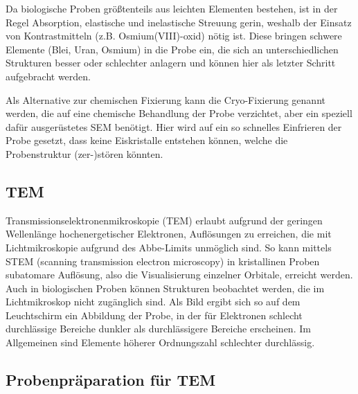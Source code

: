 Da biologische Proben größtenteils aus leichten Elementen bestehen, ist in der Regel Absorption, elastische und inelastische Streuung gerin, weshalb der Einsatz von Kontrastmitteln (z.B. Osmium(VIII)-oxid) nötig ist.
Diese bringen schwere Elemente (Blei, Uran, Osmium) in die Probe ein, die sich an unterschiedlichen Strukturen besser oder schlechter anlagern und können hier als letzter Schritt aufgebracht werden.

Als Alternative zur chemischen Fixierung kann die Cryo-Fixierung genannt werden, die auf eine chemische Behandlung der Probe verzichtet, aber ein speziell dafür ausgerüstetes SEM benötigt.
Hier wird auf ein so schnelles Einfrieren der Probe gesetzt, dass keine Eiskristalle entstehen können, welche die Probenstruktur (zer-)stören könnten.





\subsection{TEM}

Transmissionselektronenmikroskopie (TEM) erlaubt aufgrund der geringen Wellenlänge hochenergetischer Elektronen, Auflösungen zu erreichen, die mit Lichtmikroskopie aufgrund des Abbe-Limits unmöglich sind.
So kann mittels STEM (scanning transmission electron microscopy) in kristallinen Proben subatomare Auflösung, also die Visualisierung einzelner Orbitale, erreicht werden.
Auch in biologischen Proben können Strukturen beobachtet werden, die im Lichtmikroskop nicht zugänglich sind.
Als Bild ergibt sich so auf dem Leuchtschirm ein Abbildung der Probe, in der für Elektronen schlecht durchlässige Bereiche dunkler als durchlässigere Bereiche erscheinen.
Im Allgemeinen sind Elemente höherer Ordnungszahl schlechter durchlässig.

\subsection{Probenpräparation für TEM}


